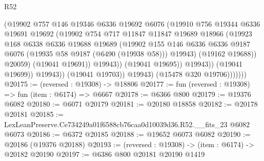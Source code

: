 \begin{lexlean}{R52}
\begin{coremodule}
                                  (@19902
                                    @757
                                    @146
                                    @19346
                                    @6336
                                    @19692
                                    @6076
                                    (@19910
                                      @756
                                      @19344
                                      @6336
                                      @19691
                                      @19692
                                      (@19902
                                        @754
                                        @717
                                        @11847
                                        @11847
                                        @19689
                                        @18966
                                        (@19923
                                          @168
                                          @6338
                                          @6336
                                          @19688
                                          @19689
                                          (@19902
                                            @155
                                            @146
                                            @6336
                                            @6336
                                            @9187
                                            @6076
                                            (@19935 @58 @9187 (@6490 (@19938 @58)))
                                            @19943)
                                          (@19162 @19688))
                                        @20059)
                                      (@19041 @19691))
                                    @19943))
                                (@19041 @19695))
                              @19943))
                          (@19041 @19699))
                        @19943))
                    (@19041 @19703))
                  @19943)
                (@15478 @320 @19706)))))))
@20175 := (reversed : @19308) -> @18806
@20177 := fun (reversed : @19308) => fun (item : @6174) => @6667
@20178 := @6366 @800
@20179 := @19376 @6082
@20180 := @6071 @20179
@20181 := @20180 @18858
@20182 := @20178 @20181
@20185 := LexLeanPreserve.Ce734249a01f6588cb76caa0d10039d36.R52.__fits_23 @6082 @6073
@20186 := @6372 @20185
@20188 := @19652 @6073 @6082
@20190 := @20186 (@19376 @20188)
@20193 := (reversed : @19308) -> (item : @6174) -> @20182 @20190
@20197 := @6386 @800 @20181 @20190 @1419

\end{coremodule}
\end{lexlean}
